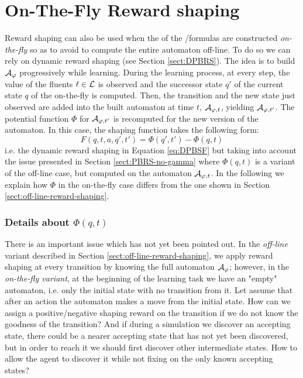 \section{On-The-Fly Reward shaping}\label{sect:on-the-fly-reward-shaping}
Reward shaping can also be used when the \DFAs of the \LTLf /\LDLf formulas are constructed \emph{on-the-fly} \citep{AAAI1817342} so as to avoid to compute the entire automaton off-line. To do so we can rely on dynamic reward shaping (see Section \ref{sect:DPBRS}).
The idea is to build $\mathcal{A}_{\varphi}$ progressively while learning. During the learning process, at every step, the value of the fluents $\ell \in \mathcal{L}$ is observed and the successor state $q'$ of the current state $q$ of the \DFA on-the-fly is computed. 
Then, the transition and the new state just observed are added into the built automaton at time $t$, $\mathcal{A}_{\varphi, t}$, yielding $\mathcal{A}_{\varphi, t'}$. The potential function $\Phi$ for $\mathcal{A}_{\varphi, t'}$ is recomputed for the new version of the automaton. In this case, the shaping function takes the following form: 
\begin{equation}
F(q, t, a, q', t') = \Phi(q', t') - \Phi(q, t)
\end{equation}
i.e. the dynamic reward shaping in Equation \ref{eq:DPBSF} but taking into account the issue presented in Section \ref{sect:PBRS-no-gamma}
where $\Phi(q, t)$ is a variant of the off-line case, but computed on the automaton $\mathcal{A}_{\varphi, t}$. In the following we explain how $\Phi$ in the on-the-fly case differs from the one shown in Section \ref{sect:off-line-reward-shaping}.

\subsubsection{Details about $\Phi(q, t)$}
There is an important issue which has not yet been pointed out. In the \emph{off-line} variant described in Section \ref{sect:off-line-reward-shaping}, we apply reward shaping at every transition by knowing the full automaton $\mathcal{A}_\varphi$; however, in the \emph{on-the-fly variant}, at the beginning of the learning task we have an "empty" automaton, i.e. only the initial state with no transition from it. 
Let assume that after an action the automaton makes a move from the initial state. How can we assign a positive/negative shaping reward on the transition if we do not know the goodness of the transition?
And if during a simulation we discover an accepting state, there could be a nearer accepting state that has not yet been discovered, but in order to reach it we should first discover other intermediate states. How to allow the agent to discover it while not fixing on the only known accepting states?

